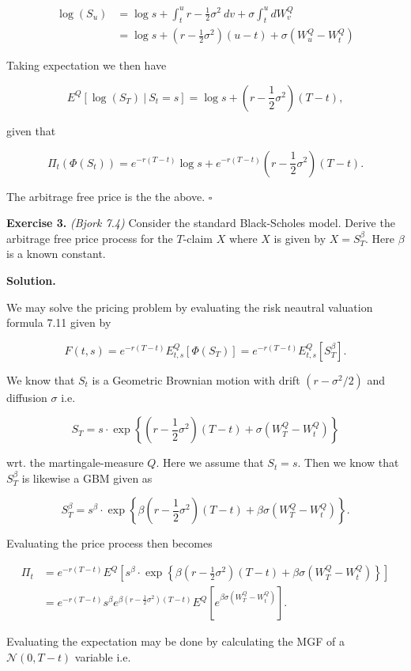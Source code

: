 \documentclass[
]{book}
\begin{document}
\begin{align*}
\log(S_u)&=\log s+\int_t^ur-\frac{1}{2}\sigma^2\ dv+\sigma\int_t^u dW_v^Q\\
&=\log s+\left(r-\frac{1}{2}\sigma^2\right)(u-t)+\sigma(W_u^Q-W_t^Q)
\end{align*}

Taking expectation we then have

\[
E^Q[\log(S_T)\ \vert\ S_t=s]=\log s+\left(r-\frac{1}{2}\sigma^2\right)(T-t),
\]

given that

\[
\Pi_t(\Phi(S_t))=e^{-r(T-t)}\log s+e^{-r(T-t)}\left(r-\frac{1}{2}\sigma^2\right)(T-t).
\]

The arbitrage free price is the the above. \(\square\)

\textbf{Exercise 3.} \emph{(Bjork 7.4)} Consider the standard Black-Scholes model. Derive the arbitrage free price process for the \(T\)-claim \(X\) where \(X\) is given by \(X=S_T^\beta\). Here \(\beta\) is a known constant.

\textbf{Solution.}

We may solve the pricing problem by evaluating the risk neautral valuation formula 7.11 given by

\[
F(t,s)=e^{-r(T-t)}E^Q_{t,s}[\Phi(S_T)]=e^{-r(T-t)}E^Q_{t,s}[S_T^\beta].
\]

We know that \(S_t\) is a Geometric Brownian motion with drift \((r-\sigma^2/2)\) and diffusion \(\sigma\) i.e.

\[
S_T=s\cdot\exp\left\{\left(r-\frac{1}{2}\sigma^2\right)(T-t)+\sigma (W_T^Q-W_t^Q)\right\}
\]

wrt. the martingale-measure \(Q\). Here we assume that \(S_t=s\). Then we know that \(S_T^\beta\) is likewise a GBM given as

\[
S_T^\beta=s^\beta\cdot\exp\left\{\beta\left(r-\frac{1}{2}\sigma^2\right)(T-t)+\beta\sigma  (W_T^Q-W_t^Q)\right\}.
\]

Evaluating the price process then becomes

\begin{align*}
\Pi_t&=e^{-r(T-t)}E^Q\left[s^\beta\cdot\exp\left\{\beta\left(r-\frac{1}{2}\sigma^2\right)(T-t)+\beta\sigma  (W_T^Q-W_t^Q)\right\}\right]\\
&=e^{-r(T-t)}s^\beta e^{\beta\left(r-\frac{1}{2}\sigma^2\right)(T-t)}E^Q\left[e^{\beta\sigma(W_T^Q-W_t^Q)}\right].
\end{align*}

Evaluating the expectation may be done by calculating the MGF of a \(\mathcal{N}(0,T-t)\) variable i.e.
\end{document}
